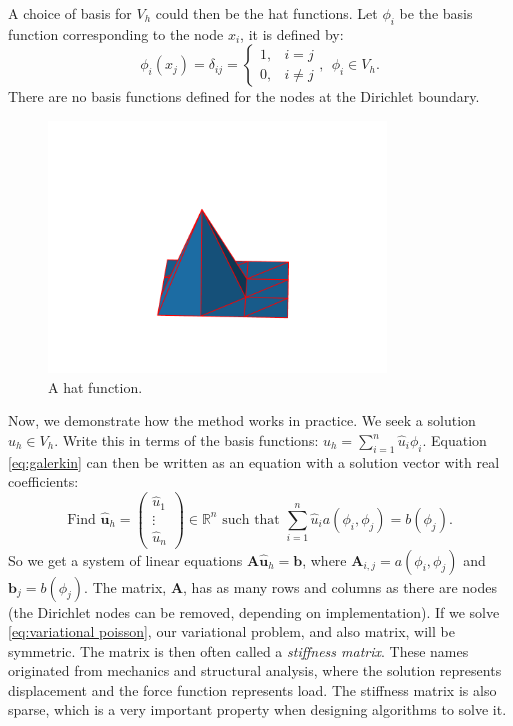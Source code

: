 \documentclass[../Main/main.tex]{subfiles}
\begin{document}
	A choice of basis for $V_h$ could then be the hat functions.  Let $\phi_i$ be the basis function corresponding to the node $x_i$, it is defined by:
	\begin{equation*}
		\phi_i(x_j) = \delta_{ij}=\left\{\begin{matrix}
			1, &i=j \\ 
			0, &i\neq j 
		\end{matrix}\right., \ \ \phi_i \in V_h.
	\end{equation*}
	There are no basis functions defined for the nodes at the Dirichlet boundary.
	\begin{figure}[H]
		\centering
		\includegraphics[width=0.8\textwidth]{hat_function_python_plot_2.pdf}
		\caption{A hat function.}
		\label{fig:hat1}
	\end{figure}
	Now, we demonstrate how the method works in practice. We seek a solution $u_h \in V_h$. Write this in terms of the basis functions: $u_h = \sum_{i=1}^n \hat{u}_i \phi_i$. Equation \eqref{eq:galerkin} can then be written as an equation with a solution vector with real coefficients:
	\begin{equation}\label{eq:fem system}
			\text{Find }\hat{\bm{u}}_h=\begin{pmatrix}
				\hat{u}_1\\ 
				\vdots \\ 
				\hat{u}_n
			\end{pmatrix}\in \mathbb{R}^n \text{ such that }\sum_{i=1}^n \hat{u}_i  a(\phi_i,\phi_j) = b(\phi_j).
	\end{equation}
	So we get a system of linear equations $\bm{A}\hat{\bm{u}}_h = \bm{b}$, where $\bm{A}_{i,j}=a(\phi_i,\phi_j)$ and $\bm{b}_j = b(\phi_j)$. The matrix, $\bm{A}$, has as many rows and columns as there are nodes (the Dirichlet nodes can be removed, depending on implementation). If we solve \eqref{eq:variational poisson}, our variational problem, and also matrix, will be symmetric. The matrix is then often called a \emph{stiffness matrix}. These names originated from mechanics and structural analysis, where the solution represents displacement and the force function represents load. The stiffness matrix is also sparse, which is a very important property when designing algorithms to solve it.\par
\end{document}
